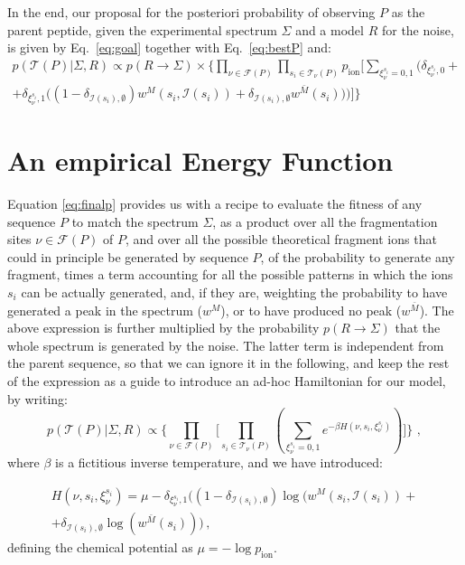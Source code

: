 In the end, our proposal for the posteriori probability  of observing $P$ as the
parent peptide, given the experimental spectrum $\Sigma$ and a model $R$ for the
noise, is given by Eq.~\ref{eq:goal} together  with
Eq.~\ref{eq:bestP} and:
\begin{multline}
p(\mathcal T(P)\vert \Sigma, R) \propto
p(R\to\Sigma)\times
\Bigg\{\prod_{\nu\in\mathcal F(P)}
\prod_{s_i\in\mathcal T_\nu(P)}
p_{\text{ion}}
\Bigg[
\sum_{\xi_\nu^{s_i}=0,1} \Bigg( 
\delta_{\xi_\nu^{s_i},0} +\\
+\delta_{\xi_\nu^{s_i},1}\Big(
(1-\delta_{\mathcal I(s_i),\emptyset})w^M(s_i,\mathcal I(s_i))
+\delta_{\mathcal I(s_i),\emptyset}w^{\bar M}(s_i)
\Big)\Bigg)
\Bigg]\Bigg\}
\label{eq:finalp}
\end{multline}



\section{An empirical Energy Function}
\label{potential}
Equation \ref{eq:finalp} provides us with a recipe to evaluate the fitness of
any sequence $P$ to match the spectrum $\Sigma$, as a product over all the
fragmentation sites $\nu \in \mathcal F(P)$ of $P$, and over all the possible
theoretical fragment ions that could in principle be generated by sequence $P$,
of the probability to generate any fragment, times a term accounting for all the
possible patterns in which the ions  $s_i$ can be  actually generated, and, if
they are, weighting the probability to have generated a peak in the spectrum
($w^M$), or to have produced no peak ($w^{\bar M}$).
The above expression is further multiplied by the probability $p(R\to\Sigma)$
that the whole spectrum is generated by the noise. The latter term is
independent from the parent sequence, so that we can ignore it in the following,
and keep the rest of the expression as a guide to introduce an ad-hoc
Hamiltonian for our model, by writing:
\begin{equation}
p(\mathcal T(P)\vert \Sigma, R) \propto
\Bigg\{\prod_{\nu\in\mathcal F(P)}
\Bigg[
\prod_{s_i\in\mathcal T_\nu(P)}
\left(
\sum_{\xi_\nu^{s_i}=0,1} e^{-\beta H(\nu,s_i,\xi_\nu^{s_i})}
\right)
\Bigg]\Bigg\} \,\,,
\end{equation}
where $\beta$ is a fictitious inverse temperature, and  we have introduced:

\begin{multline}
H(\nu,s_i,\xi_\nu^{s_i})=\mu-\delta_{\xi_\nu^{s_i},1} 
\Big(
(1-\delta_{\mathcal I(s_i),\emptyset}) \log (w^M(s_i,\mathcal I(s_i))+\\
+\delta_{\mathcal I(s_i),\emptyset} \log (w^{\bar M}(s_i))
\Big)\,,
\label{eq:Ham}
\end{multline}
defining the chemical potential as $\mu=-\log p_{\text{ion}}$.


